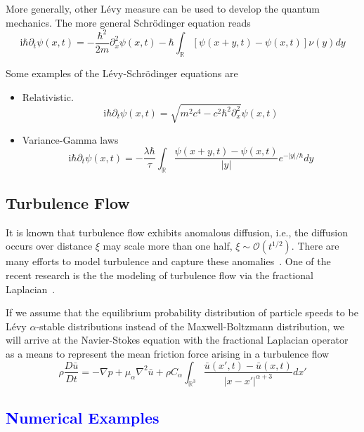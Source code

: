 \documentclass[3p,,preprint,12pt]{elsarticle}
\newcommand{\ii}[0]{\mathrm{i}}
\newcommand{\RR}[0]{\mathbb{R}}
\newcommand{\lib}[1]{\textcolor{blue}{\section{#1}}}
\theoremstyle{definition}
\begin{document}
More generally, other L\'evy measure can be used to develop the quantum mechanics. The more general Schr\"odinger equation reads
\begin{equation}
	\ii \hbar\partial_t \psi(x,t) = -\frac{\hbar^2}{2m}\partial_x^2 \psi(x,t) - \hbar  \int_\RR [\psi(x+y,t)-\psi(x,t)]\nu(y)dy
\end{equation}

Some examples of the L\'evy-Schr\"odinger equations are
\begin{itemize}
	\item Relativistic.
	\begin{equation}
		\ii \hbar\partial_t \psi(x,t) = \sqrt{m^2c^4-c^2\hbar^2\partial_x^2} \psi(x,t)
	\end{equation}
	\item Variance-Gamma laws
	\begin{equation}
		\ii \hbar\partial_t \psi(x,t) = -\frac{\lambda\hbar}{\tau}\int_\RR\frac{\psi(x+y,t)-\psi(x,t)}{|y|}e^{-|y|/\hbar}dy
	\end{equation}

\end{itemize}

\subsection{Turbulence Flow}

It is known that turbulence flow exhibits anomalous diffusion, i.e., the diffusion occurs over distance $\xi$ may scale more than one half, $\xi\sim\mathcal{O}(t^{1/2})$. There are many efforts to model turbulence and capture these anomalies~\cite{chen2010anomalous,chen2006speculative}. One of the recent research is the the modeling of turbulence flow via the fractional Laplacian~\cite{epps2018turbulence}. 

If we assume that the equilibrium probability distribution of particle speeds to be L\'evy $\alpha$-stable distributions instead of the Maxwell-Boltzmann distribution, we will arrive at the Navier-Stokes equation with the fractional Laplacian operator as a means to represent the mean friction force arising in a turbulence flow
\begin{equation}
	\rho\frac{D\bar u}{Dt} = -\nabla p + \mu_\alpha \nabla^2 \bar u + \rho C_\alpha \int_{\RR^3} \frac{\bar u(x',t)-\bar u(x,t)}{|x-x'|^{\alpha+3}} dx'
\end{equation}



\lib{Numerical Examples}
\end{document}

